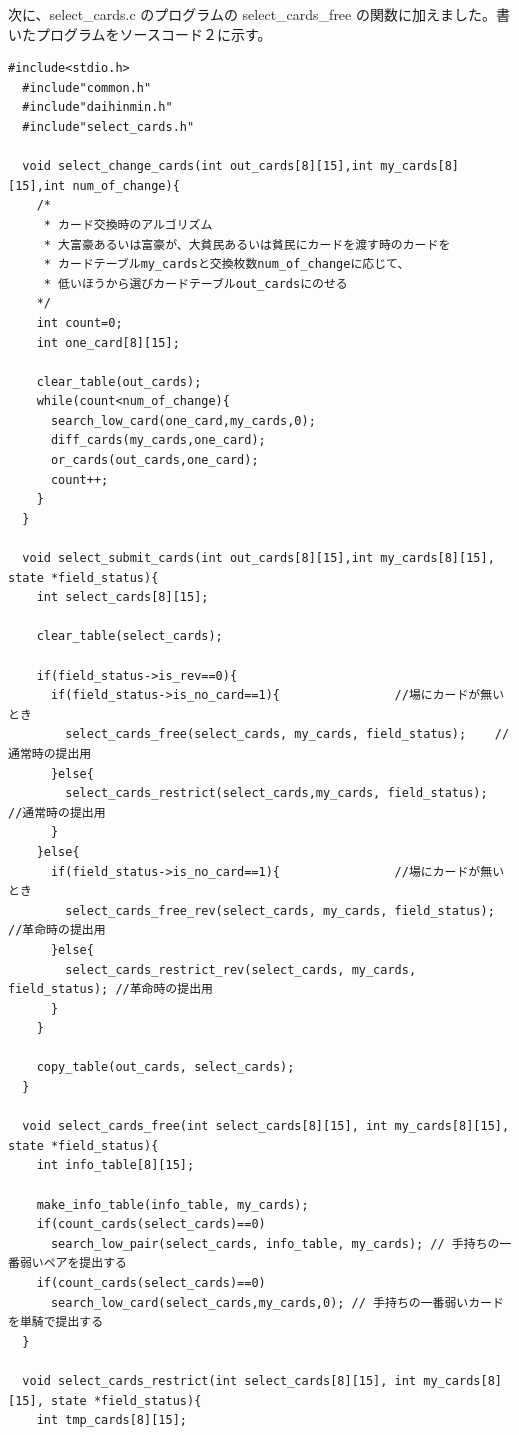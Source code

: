\documentclass[]{jsarticle}
\begin{document}
次に、select\_cards.c のプログラムの select\_cards\_free の関数に加えました。書いたプログラムをソースコード２に示す。

\begin{lstlisting}[caption={select\_cards.c}]
  #include<stdio.h>
  #include"common.h"
  #include"daihinmin.h"
  #include"select_cards.h"
  
  void select_change_cards(int out_cards[8][15],int my_cards[8][15],int num_of_change){
    /*
     * カード交換時のアルゴリズム
     * 大富豪あるいは富豪が、大貧民あるいは貧民にカードを渡す時のカードを
     * カードテーブルmy_cardsと交換枚数num_of_changeに応じて、
     * 低いほうから選びカードテーブルout_cardsにのせる
    */
    int count=0;
    int one_card[8][15];
    
    clear_table(out_cards);
    while(count<num_of_change){
      search_low_card(one_card,my_cards,0);
      diff_cards(my_cards,one_card);
      or_cards(out_cards,one_card);
      count++;
    }
  }
  
  void select_submit_cards(int out_cards[8][15],int my_cards[8][15], state *field_status){
    int select_cards[8][15];
   
    clear_table(select_cards);
  
    if(field_status->is_rev==0){
      if(field_status->is_no_card==1){                //場にカードが無いとき
        select_cards_free(select_cards, my_cards, field_status);    //通常時の提出用
      }else{
        select_cards_restrict(select_cards,my_cards, field_status);    //通常時の提出用
      }
    }else{
      if(field_status->is_no_card==1){                //場にカードが無いとき
        select_cards_free_rev(select_cards, my_cards, field_status); //革命時の提出用
      }else{
        select_cards_restrict_rev(select_cards, my_cards, field_status); //革命時の提出用
      }
    }
  
    copy_table(out_cards, select_cards);
  }
  
  void select_cards_free(int select_cards[8][15], int my_cards[8][15], state *field_status){
    int info_table[8][15];
  
    make_info_table(info_table, my_cards);
    if(count_cards(select_cards)==0)
      search_low_pair(select_cards, info_table, my_cards); // 手持ちの一番弱いペアを提出する
    if(count_cards(select_cards)==0)
      search_low_card(select_cards,my_cards,0); // 手持ちの一番弱いカードを単騎で提出する
  }
  
  void select_cards_restrict(int select_cards[8][15], int my_cards[8][15], state *field_status){
    int tmp_cards[8][15];
   

\end{lstlisting}
\end{document}

